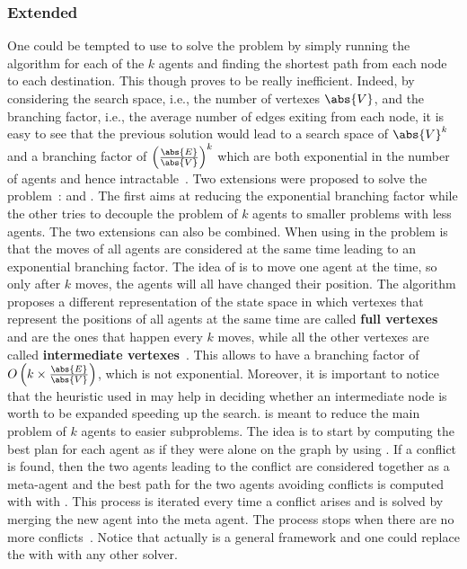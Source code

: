 \subsubsection{Extended \astar}
One could be tempted to use \astar to solve the  problem by simply
running the algorithm for each of the $k$ agents and finding the shortest path
from each node to each destination. This though proves to be really
inefficient. Indeed, by considering the search space, i.e., the number of
vertexes $\abs{V}$, and the branching factor, i.e., the average number of edges
exiting from each node, it is easy to see that the previous solution would lead
to a search space of $\abs{V}^k$ and a branching factor of
$\left(\frac{\abs{E}}{\abs{V}}\right)^k$ which are both exponential in the
number of agents and hence intractable~\cite{MAPF_overview}. \newline
Two extensions were proposed to solve the  problem~\cite{ODandID}: 
 and . The first aims at reducing the exponential branching
factor while the other tries to decouple the problem of $k$ agents to smaller
problems with less agents. The two extensions can also be combined. \newline
When using \astar in  the problem is that the moves of all agents
are considered at the same time leading to an exponential branching factor. The 
idea of  is to move one agent at the time, so only after $k$ moves, 
the agents will all have changed their position. The algorithm proposes a
different representation of the state space in which vertexes that represent
the positions of all agents at the same time are called \textbf{full vertexes}
and are the ones that happen every $k$ moves, while all the other vertexes are 
called \textbf{intermediate vertexes}~\cite{ODandIDM,APF_overview}. This
allows to have a branching factor of 
$O\left(k\times\frac{\abs{E}}{\abs{V}}\right)$, which is not exponential.
Moreover, it is important to notice that the heuristic used in \astar may help
in deciding whether an intermediate node is worth to be expanded speeding up
the search. \newline
{} is meant to reduce the main problem of $k$ agents to easier
subproblems. The idea is to start by computing the best plan for each agent as
if they were alone on the graph by using \astar. If a conflict is found, then
the two agents leading to the conflict are considered together as a meta-agent
and the best path for the two agents avoiding conflicts is computed with
\astar with . This process is iterated every time a conflict arises
and is solved by merging the new agent into the meta agent. The process stops
when there are no more conflicts~\cite{ODandID}. \newline
Notice that actually  is a general framework and one could replace the
\astar with  with any other  solver. 
%
